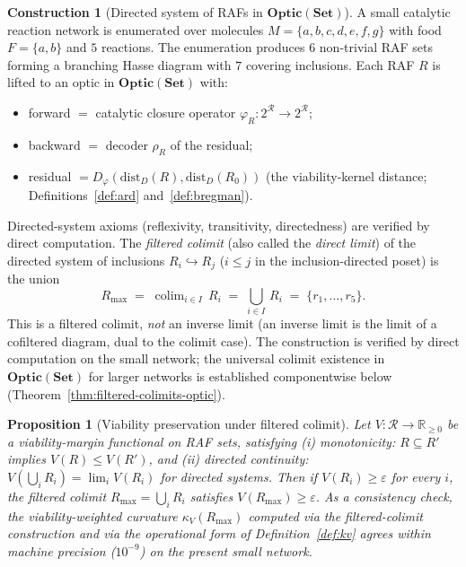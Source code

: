 \documentclass[11pt,a4paper]{article}
\theoremstyle{plain}
\newtheorem{proposition}[theorem]{Proposition}
\theoremstyle{definition}
\newtheorem{construction}[theorem]{Construction}
\theoremstyle{remark}
\newcommand{\kk}{\kappa_{\!V}}
\newcommand{\RR}{\mathbb{R}}
\newcommand{\Optic}{\mathbf{Optic}}
\newcommand{\colim}{\operatorname{colim}}
\begin{document}
\begin{construction}[Directed system of RAFs in $\Optic(\mathbf{Set})$]
\label{con:invlim}
A small catalytic reaction network is enumerated over molecules
$M = \{a,b,c,d,e,f,g\}$ with food $F = \{a,b\}$ and $5$ reactions. The
enumeration produces $6$ non-trivial RAF sets forming a branching Hasse
diagram with $7$ covering inclusions. Each RAF $R$ is lifted to an
optic in $\Optic(\mathbf{Set})$ with:
\begin{itemize}[leftmargin=1.2em,itemsep=1pt]
\item forward $=$ catalytic closure operator $\varphi_R:
2^{\mathcal{R}}\to 2^{\mathcal{R}}$;
\item backward $=$ decoder $\rho_R$ of the residual;
\item residual $= D_\varphi(\mathrm{dist}_D(R), \mathrm{dist}_D(R_0))$
(the viability-kernel distance; Definitions~\ref{def:ard}
and~\ref{def:bregman}).
\end{itemize}
Directed-system axioms (reflexivity, transitivity, directedness) are
verified by direct computation. The \emph{filtered colimit} (also
called the \emph{direct limit}) of the directed system of inclusions
$R_i \hookrightarrow R_j$ ($i \leq j$ in the inclusion-directed
poset) is the union
\begin{equation}\label{eq:rmax-colim}
  R_{\max} \;=\; \colim_{i\in I}\, R_i \;=\; \bigcup_{i\in I}\, R_i
  \;=\; \{r_1, \ldots, r_5\}.
\end{equation}
This is a filtered colimit, \emph{not} an inverse limit (an inverse
limit is the limit of a cofiltered diagram, dual to the colimit case).
The construction is verified by direct computation on the small
network; the universal colimit existence in $\Optic(\mathbf{Set})$ for
larger networks is established componentwise below
(Theorem~\ref{thm:filtered-colimits-optic}).
\end{construction}

\begin{proposition}[Viability preservation under filtered colimit]
\label{prop:invlim}
Let $V : \mathcal R \to \RR_{\geq 0}$ be a viability-margin functional
on RAF sets, satisfying (i) \emph{monotonicity}: $R \subseteq R'$
implies $V(R) \leq V(R')$, and (ii) \emph{directed continuity}:
$V(\bigcup_i R_i) = \lim_i V(R_i)$ for directed systems. Then if
$V(R_i) \geq \varepsilon$ for every $i$, the filtered colimit
$R_{\max} = \bigcup_i R_i$ satisfies $V(R_{\max}) \geq \varepsilon$.
As a consistency check, the viability-weighted curvature
$\kk(R_{\max})$ computed via the filtered-colimit construction and
via the operational form of Definition~\ref{def:kv} agrees within
machine precision ($10^{-9}$) on the present small network.
\end{proposition}
\end{document}
